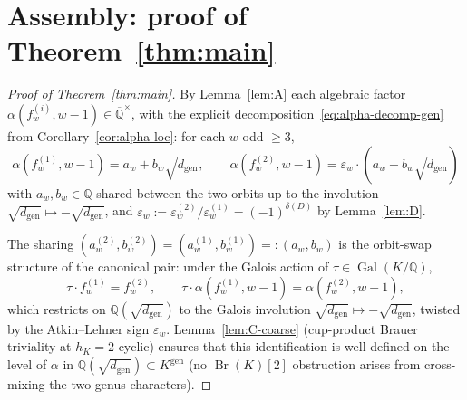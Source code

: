 \documentclass[11pt,a4paper]{amsart}
\theoremstyle{plain}
\theoremstyle{definition}
\DeclareMathOperator{\Gal}{Gal}
\DeclareMathOperator{\Br}{Br}
\newcommand{\Q}{\mathbb{Q}}
\newcommand{\Kgen}{K^{\mathrm{gen}}}
\newcommand{\Qbar}{\overline{\Q}}
\newcommand{\eqdef}{:=}
\newcommand{\fl}[2]{f_{#1}^{(#2)}}
\newcommand{\dgen}{d_{\mathrm{gen}}}
\begin{document}
\section{Assembly: proof of Theorem~\ref{thm:main}}\label{sec:assembly}

\begin{proof}[Proof of Theorem~\ref{thm:main}]
By Lemma~\ref{lem:A} each algebraic factor $\alpha(\fl{w}{i}, w{-}1) \in
\Qbar^\times$, with the explicit
decomposition~\eqref{eq:alpha-decomp-gen} from
Corollary~\ref{cor:alpha-loc}: for each $w$ odd $\ge 3$,
\[
   \alpha(\fl{w}{1}, w{-}1) = a_w + b_w \sqrt{\dgen},
   \qquad
   \alpha(\fl{w}{2}, w{-}1) = \varepsilon_w \cdot (a_w - b_w \sqrt{\dgen})
\]
with $a_w, b_w \in \Q$ shared between the two orbits up to the
involution $\sqrt{\dgen} \mapsto -\sqrt{\dgen}$, and $\varepsilon_w
\eqdef \varepsilon_w^{(2)}/\varepsilon_w^{(1)} = (-1)^{\delta(D)}$ by
Lemma~\ref{lem:D}.

The sharing $(a_w^{(2)}, b_w^{(2)}) = (a_w^{(1)}, b_w^{(1)}) =: (a_w, b_w)$
is the orbit-swap structure of the canonical pair: under the Galois
action of $\tau \in \Gal(K/\Q)$,
\[
   \tau \cdot \fl{w}{1} = \fl{w}{2},
   \qquad
   \tau \cdot \alpha(\fl{w}{1}, w{-}1) = \alpha(\fl{w}{2}, w{-}1),
\]
which restricts on $\Q(\sqrt{\dgen})$ to the Galois involution
$\sqrt{\dgen} \mapsto -\sqrt{\dgen}$, twisted by the Atkin--Lehner
sign $\varepsilon_w$.  Lemma~\ref{lem:C-coarse}
(cup-product Brauer triviality at $h_K = 2$ cyclic) ensures that this
identification is well-defined on the level of $\alpha$ in
$\Q(\sqrt{\dgen}) \subset \Kgen$ (no $\Br(K)[2]$ obstruction
arises from cross-mixing the two genus characters).


\end{proof}
\end{document}
